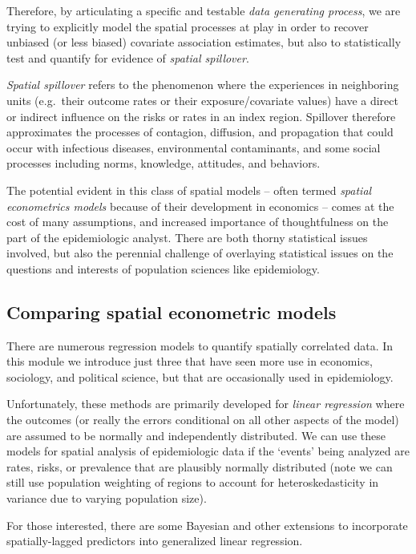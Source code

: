 \documentclass[
]{book}
\begin{document}
Therefore, by articulating a specific and testable \emph{data generating process}, we are trying to explicitly model the spatial processes at play in order to recover unbiased (or less biased) covariate association estimates, but also to statistically test and quantify for evidence of \emph{spatial spillover}.

\emph{Spatial spillover} refers to the phenomenon where the experiences in neighboring units (e.g.~their outcome rates or their exposure/covariate values) have a direct or indirect influence on the risks or rates in an index region. Spillover therefore approximates the processes of contagion, diffusion, and propagation that could occur with infectious diseases, environmental contaminants, and some social processes including norms, knowledge, attitudes, and behaviors.

The potential evident in this class of spatial models -- often termed \emph{spatial econometrics models} because of their development in economics -- comes at the cost of many assumptions, and increased importance of thoughtfulness on the part of the epidemiologic analyst. There are both thorny statistical issues involved, but also the perennial challenge of overlaying statistical issues on the questions and interests of population sciences like epidemiology.

\hypertarget{comparing-spatial-econometric-models}{%
\subsection{Comparing spatial econometric models}\label{comparing-spatial-econometric-models}}

There are numerous regression models to quantify spatially correlated data. In this module we introduce just three that have seen more use in economics, sociology, and political science, but that are occasionally used in epidemiology.

Unfortunately, these methods are primarily developed for \emph{linear regression} where the outcomes (or really the errors conditional on all other aspects of the model) are assumed to be normally and independently distributed. We can use these models for spatial analysis of epidemiologic data if the `events' being analyzed are rates, risks, or prevalence that are plausibly normally distributed (note we can still use population weighting of regions to account for heteroskedasticity in variance due to varying population size).

For those interested, there are some Bayesian and other extensions to incorporate spatially-lagged predictors into generalized linear regression.
\end{document}
